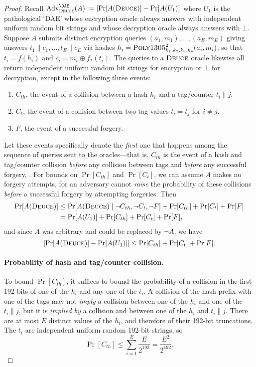 \documentclass[draft]{article}
\def\operatorsc#1{{%
  \ifmmode\let\next=\operatorname\else\let\next=\relax\fi\next{\textsc{#1}}}}
\def\Poly#1/{\operatorsc{Poly#1}}
\def\Deuce/{\operatorsc{Deuce}}
\DeclareMathOperator{\Adv}{Adv}
\newcommand{\concat}{\mathbin\|}
\newcommand{\given}{\mathrel|}
\begin{document}
\begin{proof}

Recall
 $\Adv^{\DAE}_{\Deuce/}(A) := \lvert\Pr[A(\Deuce/)] - \Pr[A(U_1)]$
 where $U_1$ is the pathological `DAE' whose encryption oracle always
 answers with independent uniform random bit strings and whose
 decryption oracle always answers with $\bot$.
Suppose $A$ submits distinct encryption queries
 $(a_1, m_1), \dotsc, (a_E, m_E)$
 giving answers
 $t_1 \concat c_1, \dotsc, t_E \concat c_E$
 via hashes
 $h_i = \Poly1305/^2_{k_1,k_2,k_3,k_4}(a_i, m_i)$,
 so that
 $t_i = f(h_i)$
 and
 $c_i = m_i \oplus f_*(t_i)$.
The queries to a $\Deuce/$ oracle likewise all return independent
 uniform random bit strings for encryption or $\bot$ for decryption,
 except in the following three events:
%
\begin{enumerate}
  \item
    $C_{th}$, the event of a collision between a hash $h_i$ and a
     tag/counter $t_i \concat j$.
  \item
    $C_t$, the event of a collision between two tag values $t_i = t_j$
     for $i \ne j$.
  \item
    $F$, the event of a successful forgery.
\end{enumerate}
%
Let these events specifically denote the \emph{first} one that
 happens among the sequence of queries sent to the oracles---that is,
 $C_{th}$ is the event of a hash and tag/counter collision
 \emph{before} any collision between tags and \emph{before} any
 successful forgery, \etc.
For bounds on $\Pr[C_{th}]$ and $\Pr[C_t]$, we can assume $A$ makes no
 forgery attempts, for an adversary cannot \emph{raise} the probability
 of these collisions \emph{before} a successful forgery by attempting
 forgeries.
Then
%
\begin{align*}
  \Pr[A(\Deuce/)]
  &\leq \Pr[A(\Deuce/) \given \lnot C_{th}, \lnot C_t, \lnot F]
     + \Pr[C_{th}] + \Pr[C_t] + \Pr[F] \\
  &= \Pr[A(U_1)] + \Pr[C_{th}] + \Pr[C_t] + \Pr[F],
\end{align*}
%
 and since $A$ was arbitrary and could be replaced by $\lnot A$, we
 have
\[
  \lvert\Pr[A(\Deuce/)] - \Pr[A(U_1)]\rvert
  \leq \Pr[C_{th}] + \Pr[C_t] + \Pr[F].
\]

\paragraph*{Probability of hash and tag/counter collision.}
To bound $\Pr[C_{th}]$, it suffices to bound the probability of a
 collision in the first 192 bits of one of the $h_i$ and any one of the
 $t_i$.
A collision of the hash prefix with one of the tags may not
 \emph{imply} a collision between one of the $h_i$ and one of the $t_i
 \concat j$, but it is \emph{implied by} a collision and between one of
 the $h_i$ and $t_i \concat j$.
There are at most $E$ distinct values of the $h_i$, and therefore of
 their 192-bit truncations.
The $t_i$ are independent uniform random 192-bit strings, so
%
\[
  \Pr[C_{th}]
  \leq \sum_{i=1}^E \frac{E}{2^{192}}
  = \frac{E^2}{2^{192}}.
\]


\end{proof}
\end{document}
